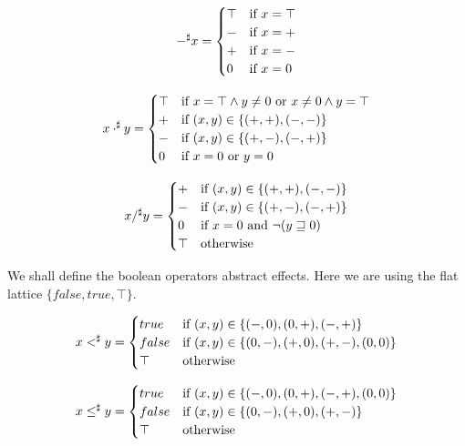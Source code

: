 \documentclass[a4paper]{article}
\begin{document}
$$
  -^\sharp x = \begin{cases}
    \top    & \text{if $ x = \top $} \\
    -       & \text{if $ x = + $} \\
    +       & \text{if $ x = - $} \\
    0       & \text{if $ x = 0 $} \\
  \end{cases}
$$

$$
  x \cdot^\sharp y = \begin{cases}
    \top      & \text{if $ x = \top \land y \ne 0 $ or $ x \ne 0 \land y = \top $} \\
    +         & \text{if $ (x, y) \in \{ (+, +), (-, -) \} $} \\
    -         & \text{if $ (x, y) \in \{ (+, -), (-, +) \} $} \\
    0         & \text{if $ x = 0 $ or $ y = 0 $ } \\
  \end{cases}
$$

$$
  x /^\sharp y = \begin{cases}
    +         & \text{if $ (x, y) \in \{ (+, +), (-, -) \} $} \\
    -         & \text{if $ (x, y) \in \{ (+, -), (-, +) \} $} \\
    0         & \text{if $ x = 0 $ and $ \lnot(y \sqsupseteq 0) $ } \\
    \top      & \text{otherwise} \\
  \end{cases}
$$

We shall define the boolean operators abstract effects. Here we are using the
flat lattice $ \{ false, true, \top \} $.

$$
  x <^\sharp y = \begin{cases}
    true    & \text{if $ (x, y) \in \{ (-, 0), (0, +), (-, +) \} $} \\
    false   & \text{if $ (x, y) \in \{ (0, -), (+, 0), (+, -), (0, 0) \} $} \\
    \top    & \text{otherwise} \\
  \end{cases}
$$

$$
  x \le^\sharp y = \begin{cases}
    true    & \text{if $ (x, y) \in \{ (-, 0), (0, +), (-, +), (0, 0) \} $} \\
    false   & \text{if $ (x, y) \in \{ (0, -), (+, 0), (+, -) \} $} \\
    \top    & \text{otherwise} \\
  \end{cases}
$$
\end{document}
